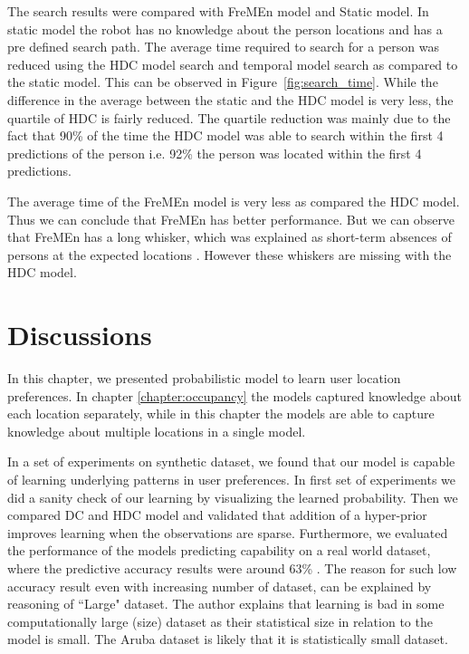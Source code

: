 The search results were compared with FreMEn model and Static model. In static model the robot has no knowledge about the person locations and has a pre defined search path. 
The average time required to search for a person was reduced using the HDC model search and temporal model search as compared to the static model. This can be observed in Figure~\ref{fig:search_time}. While the difference in the average between the static and the HDC model is very less, the quartile of HDC is fairly reduced. The quartile reduction was mainly due to the fact that 90\% of the time the HDC model was able to search within the first 4 predictions of the person i.e. 92\% the person was located within the first 4 predictions. 

The average time of the FreMEn model is very less as compared the HDC model. Thus we can conclude that FreMEn has better performance. But we can observe that FreMEn has a long whisker, which was explained as short-term absences of persons at the expected locations \citep{krajnik_wheres_2015}. However these whiskers are missing with the HDC model.

\section{Discussions}

In this chapter, we presented probabilistic model to learn user location preferences.  In chapter \ref{chapter:occupancy} the models captured knowledge about each location separately, while in this chapter the models are able to capture knowledge about multiple locations in a single model. 

In a set of experiments on synthetic dataset, we found that our model is capable of learning underlying patterns in user preferences. In first set of experiments we did a sanity check of our learning by visualizing the learned probability. Then we compared DC and HDC model and validated that addition of a hyper-prior improves learning when the observations are sparse. Furthermore, we evaluated the performance of the models predicting capability on a real world dataset, where the predictive accuracy results were around 63\% . The reason for such low accuracy result even with increasing number of dataset, can be explained by \cite{Bishop20120222} reasoning of ``Large" dataset. The author explains that learning is bad in some computationally large  (size) dataset as their statistical size in relation to the model is small. The Aruba dataset is likely that it is statistically small dataset.

